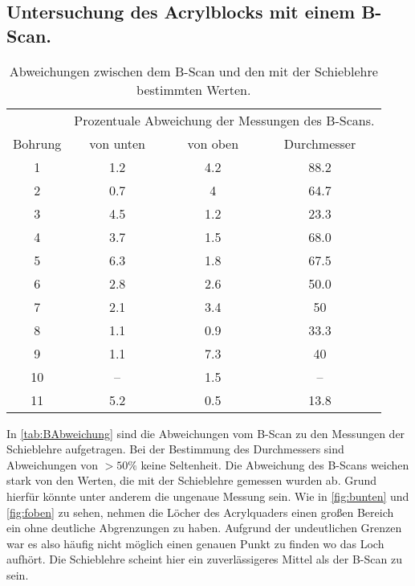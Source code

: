 \subsection{Untersuchung des Acrylblocks mit einem B-Scan.}
\begin{table}
    \centering 
    \caption{Abweichungen zwischen dem B-Scan und den mit der Schieblehre bestimmten Werten.}
\begin{tabular}{c c c c}
    \toprule
    & \multicolumn{3}{c}{Prozentuale Abweichung der Messungen des B-Scans.} \\
    Bohrung & von unten & von oben & Durchmesser\\
    \midrule
    1&1.2&4.2&88.2 \\
    2&0.7&4&64.7 \\
     3&4.5&1.2&23.3 \\
     4&3.7&1.5&68.0 \\
    5&6.3&1.8&67.5 \\
    6&2.8&2.6&50.0 \\
     7&2.1&3.4&50 \\
     8&1.1&0.9&33.3 \\
     9&1.1&7.3&40 \\
    10&--&1.5&-- \\
    11&5.2&0.5&13.8 \\
    \bottomrule
\end{tabular}
\label{tab:BAbweichung}
\end{table}
In \autoref{tab:BAbweichung} sind die Abweichungen vom B-Scan zu den Messungen der Schieblehre aufgetragen. Bei der Bestimmung des Durchmessers sind Abweichungen von $>50\%$ keine Seltenheit.
Die Abweichung des B-Scans weichen stark von den Werten, die mit der Schieblehre gemessen wurden ab. Grund hierfür könnte unter anderem die ungenaue Messung sein. 
Wie in \autoref{fig:bunten} und \autoref{fig:foben} zu sehen, nehmen die Löcher des Acrylquaders einen großen Bereich ein ohne deutliche Abgrenzungen zu haben.
Aufgrund der undeutlichen Grenzen war es also häufig nicht möglich einen genauen Punkt zu finden wo das Loch aufhört. Die Schieblehre scheint hier ein zuverlässigeres Mittel 
als der B-Scan zu sein.
